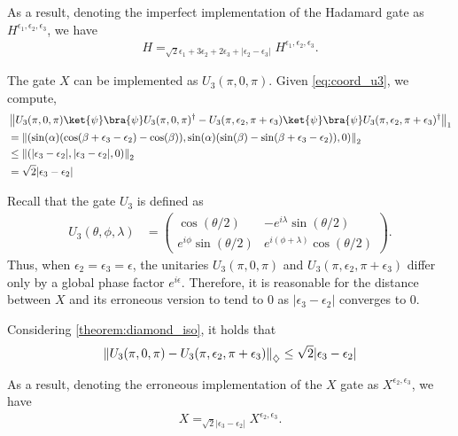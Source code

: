     
    As a result, denoting the imperfect implementation of the Hadamard gate as $H^{\epsilon_1 ,\epsilon_2, \epsilon_3}$, we have 
    \begin{align} \label{eq:h_error_telepor}
      H =_{ \sqrt{2}\epsilon_1 + 3 \epsilon_2 + 2\epsilon_3 + |\epsilon_2-\epsilon_3|} H^{\epsilon_1 ,\epsilon_2, \epsilon_3}.
    \end{align}
 

    The gate $X$ can be implemented as $U_3(\pi, 0, \pi)$. Given \autoref{eq:coord_u3}, we compute,
    \begin{align*}
      &\tracenorm{U_3(\pi, 0 , \pi) \ket{\psi}\bra{\psi}U_3(\pi,0,\pi)^\dag - U_3(\pi,\epsilon_2,\pi+\epsilon_3)  \ket{\psi}\bra{\psi}U_3(\pi,\epsilon_2,\pi+\epsilon_3)^\dag}  \\
      & =\euclideannorm{( \sin(\alpha) (\cos(\beta + \epsilon_3-\epsilon_2)-\cos(\beta)), \sin(\alpha) (\sin(\beta)-\sin(\beta + \epsilon_3-\epsilon_2)),0 )} \\
      &  \leq \euclideannorm{(|\epsilon_3-\epsilon_2|, |\epsilon_3-\epsilon_2|,0 )} \\
      & = \sqrt{2} |\epsilon_3-\epsilon_2|
    \end{align*}

   Recall that the gate $U_3$ is defined as
\begin{align*}
    U_3(\theta, \phi, \lambda) &= 
    \begin{pmatrix}
        \cos(\theta/2) & -e^{i\lambda}\sin(\theta/2) \\
        e^{i\phi}\sin(\theta/2) & e^{i(\phi+\lambda)}\cos(\theta/2)
    \end{pmatrix}.
\end{align*}
Thus, when $\epsilon_2 = \epsilon_3 = \epsilon$, the unitaries $U_3(\pi, 0, \pi)$ and $U_3(\pi, \epsilon_2, \pi + \epsilon_3)$ differ only by a global phase factor $e^{i\epsilon}$. Therefore, it is reasonable for the distance between $X$ and its erroneous version to tend to $0$ as $|\epsilon_3 - \epsilon_2|$ converges to $0$.

    Considering \autoref{theorem:diamond_iso}, it holds that
    \begin{align*}
      \left\lVert U_3(\pi, 0 , \pi)- U_3(\pi,\epsilon_2,\pi+\epsilon_3)  \right\rVert_{\diamondsuit} \leq \sqrt{2} |\epsilon_3-\epsilon_2|
    \end{align*}

    As a result, denoting the erroneous implementation of the $X$ gate as $X^{\epsilon_2, \epsilon_3}$, we have
    \begin{align} \label{eq:x_error_telepor}
      X =_{\sqrt{2} |\epsilon_3-\epsilon_2|} X^{\epsilon_2, \epsilon_3}.
    \end{align}
  


